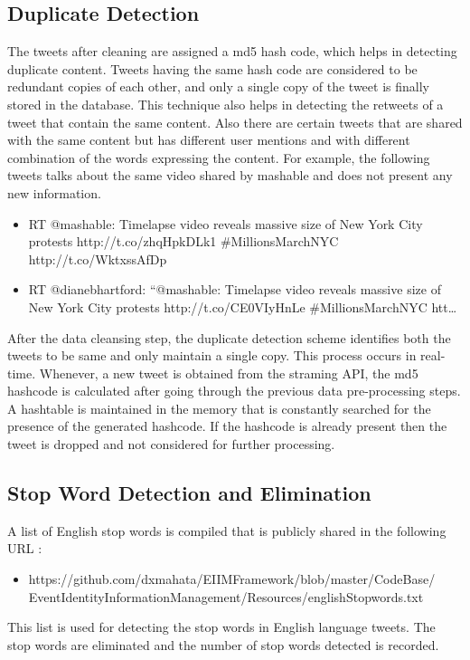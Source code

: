 \subsection{Duplicate Detection}
The tweets after cleaning are assigned a md5 hash code, which helps in detecting duplicate content. Tweets having the same hash code are considered to be redundant copies of each other, and only a single copy of the tweet is finally stored in the database. This technique also helps in detecting the retweets of a tweet that contain the same content. Also there are certain tweets that are shared with the same content but has different user mentions and with different combination of the words expressing the content. For example, the following tweets talks about the same video shared by mashable and does not present any new information. 

\begin{itemize}
\item RT @mashable: Timelapse video reveals massive size of New York City protests http://t.co/zhqHpkDLk1 \#MillionsMarchNYC http://t.co/WktxssAfDp
\item RT @dianebhartford: ``@mashable: Timelapse video reveals massive size of New York City protests http://t.co/CE0VIyHnLe \#MillionsMarchNYC htt…
\end{itemize}


After the data cleansing step, the duplicate detection scheme identifies both the tweets to be same and only maintain a single copy. This process occurs in real-time. Whenever, a new tweet is obtained from the straming API, the md5 hashcode is calculated after going through the previous data pre-processing steps. A hashtable is maintained in the memory that is constantly searched for the presence of the generated hashcode. If the hashcode is already present then the tweet is dropped and not considered for further processing.

\subsection{Stop Word Detection and Elimination}
A list of English stop words is compiled that is publicly shared in the following URL :  
\begin{itemize}
\item https://github.com/dxmahata/EIIMFramework/blob/master/CodeBase/\\EventIdentityInformationManagement/Resources/englishStopwords.txt
\end{itemize}
This list is used for detecting the stop words in English language tweets. The stop words are eliminated and the number of stop words detected is recorded.

